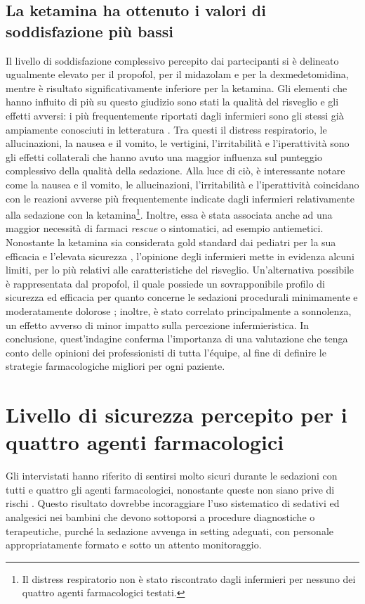 \subsection*{La ketamina ha ottenuto i valori di soddisfazione più bassi}
Il livello di soddisfazione complessivo percepito dai partecipanti si è delineato ugualmente elevato per il propofol, per il midazolam e per la dexmedetomidina, mentre è risultato significativamente inferiore per la ketamina. Gli elementi che hanno influito di più su questo giudizio sono stati la qualità del risveglio e gli effetti avversi: i più frequentemente riportati dagli infermieri sono gli stessi già ampiamente conosciuti in letteratura \citep{Bellolio2016, Krauss2006}. Tra questi il distress respiratorio, le allucinazioni, la nausea e il vomito, le vertigini, l'irritabilità e l'iperattività sono gli effetti collaterali che hanno avuto una maggior influenza sul punteggio complessivo della qualità della sedazione. Alla luce di ciò, è interessante notare come la nausea e il vomito, le allucinazioni, l'irritabilità e l'iperattività coincidano con le reazioni avverse più frequentemente indicate dagli infermieri relativamente alla sedazione con la ketamina\footnote{Il distress respiratorio non è stato riscontrato dagli infermieri per nessuno dei quattro agenti farmacologici testati.}. Inoltre, essa è stata associata anche ad una maggior necessità di farmaci \emph{rescue} o sintomatici, ad esempio antiemetici.
Nonostante la ketamina sia considerata gold standard dai pediatri per la sua efficacia e l'elevata sicurezza \citep{Krauss2006}, l'opinione degli infermieri mette in evidenza alcuni limiti, per lo più relativi alle caratteristiche del risveglio. Un'alternativa possibile è rappresentata dal propofol, il quale possiede un sovrapponibile profilo di sicurezza ed efficacia per quanto concerne le sedazioni procedurali minimamente e moderatamente dolorose \citep{Vardi2002, Ferguson2016, Jalili2016}; inoltre, è stato correlato principalmente a sonnolenza, un effetto avverso di minor impatto sulla percezione infermieristica. In conclusione, quest'indagine conferma l'importanza di una valutazione che tenga conto delle opinioni dei professionisti di tutta l'équipe, al fine di definire le strategie farmacologiche migliori per ogni paziente.

\section{Livello di sicurezza percepito per i quattro agenti farmacologici}
Gli intervistati hanno riferito di sentirsi molto sicuri durante le sedazioni con tutti e quattro gli agenti farmacologici, nonostante queste non siano prive di rischi \citep{Bellolio2016}. Questo risultato dovrebbe incoraggiare l'uso sistematico di sedativi ed analgesici nei bambini che devono sottoporsi a procedure diagnostiche o terapeutiche, purché la sedazione avvenga in setting adeguati, con personale appropriatamente formato e sotto un attento monitoraggio. 


